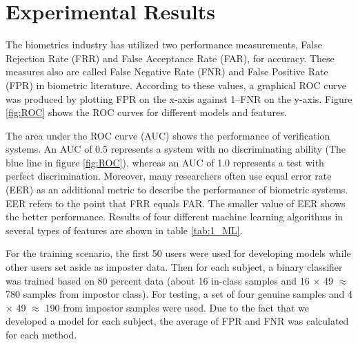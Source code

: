 


 

\section{Experimental Results}
The biometrics industry has utilized two performance measurements, False Rejection Rate (FRR) and False Acceptance Rate (FAR), for accuracy. These measures also are called False Negative Rate (FNR) and False Positive Rate (FPR) in biometric literature. According to these values, a graphical ROC curve was produced by plotting FPR on the x-axis against 1–FNR on the y-axis. Figure \ref{fig:ROC} shows the ROC curves for different models and features. 

The area under the ROC curve (AUC) shows the performance of verification systems. An AUC of 0.5 represents a system with no discriminating ability (The blue line in figure \ref{fig:ROC}), whereas an AUC of 1.0 represents a test with perfect discrimination. Moreover, many researchers often use equal error rate (EER) as an additional metric to describe the performance of biometric systems. EER refers to the point that FRR equals FAR. The smaller value of EER shows the better performance. Results of four different machine learning algorithms in several types of features are shown in table \ref{tab:1_ML}.


For the training scenario, the first 50 users were used for developing models while other users set aside as imposter data. Then for each subject, a binary classifier was trained based on 80 percent data (about 16 in-class samples and 16 $\times$ 49 $\approx$ 780 samples from impostor class). For testing, a set of four genuine samples and 4 $\times$ 49 $\approx$ 190 from impostor samples were used. Due to the fact that we developed a model for each subject, the average of FPR and FNR was calculated for each method.

